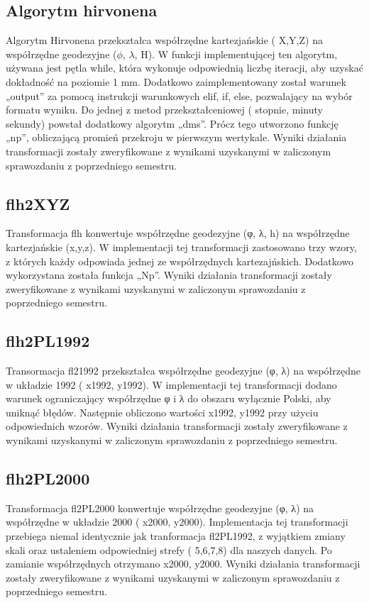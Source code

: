 \documentclass[10pt,a4paper]{article}
\begin{document}
	\subsection{Algorytm hirvonena} 
	Algorytm Hirvonena przekształca współrzędne kartezjańskie ( X,Y,Z) na współrzędne geodezyjne ($\phi$, $\lambda$, H). W funkcji implementującej ten algorytm, używana jest pętla while, która wykonuje odpowiednią liczbę iteracji, aby uzyskać dokładność na poziomie 1 mm. Dodatkowo zaimplementowany został warunek „output” za pomocą instrukcji warunkowych elif, if, else, pozwalający na wybór formatu wyniku. Do jednej z metod przekształceniowej ( stopnie, minuty sekundy) powstał dodatkowy algorytm „dms”. Prócz tego utworzono funkcję „np”, obliczającą promień przekroju w pierwszym wertykale. Wyniki działania transformacji zostały zweryfikowane z wynikami uzyskanymi w zaliczonym sprawozdaniu z poprzedniego semestru.
	
	\subsection{flh2XYZ}
	Transformacja flh konwertuje współrzędne geodezyjne (φ, λ, h) na współrzędne kartezjańskie (x,y,z). W implementacji tej transformacji zastosowano trzy wzory, z których każdy odpowiada jednej ze współrzędnych kartezajńskich. Dodatkowo wykorzystana została funkcja „Np”. Wyniki działania transformacji zostały zweryfikowane z wynikami uzyskanymi w zaliczonym sprawozdaniu z poprzedniego semestru.
	
	 

	\subsection{flh2PL1992}
	Transormacja fl21992 przekształca współrzędne geodezyjne (φ, λ) na współrzędne w układzie 1992 ( x1992, y1992). W implementacji tej transformacji dodano warunek ograniczający współrzędne φ i λ do obszaru wyłącznie Polski, aby uniknąć błędów. Następnie obliczono wartości x1992, y1992 przy użyciu odpowiednich wzorów. Wyniki działania transformacji zostały zweryfikowane z wynikami uzyskanymi w zaliczonym sprawozdaniu z poprzedniego semestru.  

	\subsection{flh2PL2000} 
	Transformacja fl2PL2000 konwertuje współrzędne geodezyjne (φ, λ) na współrzędne w układzie 2000 ( x2000, y2000). Implementacja tej transformacji przebiega niemal identycznie jak tranformacja fl2PL1992, z wyjątkiem zmiany skali oraz ustaleniem odpowiedniej strefy ( 5,6,7,8) dla naszych danych. Po zamianie współrzędnych otrzymano x2000, y2000. Wyniki działania transformacji zostały zweryfikowane z wynikami uzyskanymi w zaliczonym sprawozdaniu z poprzedniego semestru. 
\end{document}
